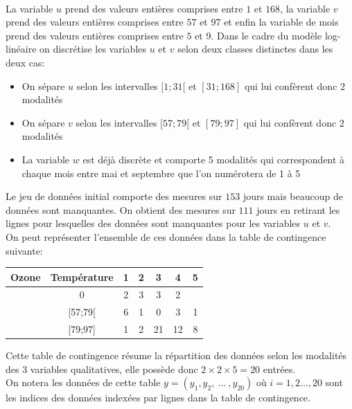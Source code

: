 \documentclass[french,12pt]{report}
\newcommand{\<}{\langle}
\renewcommand{\>}{\rangle}
\theoremstyle{definition}
\begin{document}
\\
La variable $u$ prend des valeurs entières comprises entre $1$ et $168$, la variable $v$ prend des valeurs entières comprises entre $57$ et $97$ et enfin la variable de mois prend des valeurs entières comprises entre $5$ et $9$. Dans le cadre du modèle log-linéaire on discrétise les variables $u$ et $v$ selon deux classes distinctes dans les deux cas: 

\begin{itemize}
    \item On sépare $u$ selon les intervalles $[1;31[$ et $[31;168]$ qui lui confèrent donc $2$ modalités
    \item On sépare $v$ selon les intervalles $[57;79[$ et $[79;97]$ qui lui confèrent donc $2$ modalités
    \item La variable $w$ est déjà discrète et comporte 5 modalités qui correspondent à chaque mois entre mai et septembre que l'on numérotera de 1 à 5
\end{itemize}

Le jeu de données initial comporte des mesures sur $153$ jours mais beaucoup de données sont manquantes. On obtient des mesures sur $111$ jours en retirant les lignes pour lesquelles des données sont manquantes pour les variables $u$ et $v$.\\

\newpage
On peut représenter l'ensemble de ces données dans la table de contingence suivante: 

\vspace{5mm}

\begin{center}

\begin{tabular}{|c|c||c|c|c|c|c|}
\hline
Ozone & Température & 1 & 2 & 3 & 4 & 5\\ \hline \hline
[1;31[ & [57;79[ & 17 & 4 & 2 & 5 & 18\\\hline
[1;31[ & [79;97] & 0 & 2 & 3 & 3 & 2\\\hline
[31;168] & [57;79[ & 6 & 1 & 0 & 3 & 1\\ \hline
[31;168] & [79;97] & 1 & 2 & 21 & 12 & 8\\ \hline
\end{tabular}
\end{center}

\vspace{5mm}

Cette table de contingence résume la répartition des données selon les modalités des 3 variables qualitatives, elle possède donc $2 \times 2 \times 5 = 20$ entrées. \\
On notera les données de cette table $y=(y_1,y_2,\ ...\ ,y_{20})$ où $i=1,2...,20$ sont les indices des données indexées par lignes dans la table de contingence.
\end{document}
